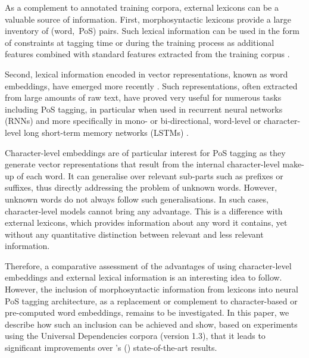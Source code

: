 \documentclass[11pt,a4paper]{article}
\newcommand\hm[1]{\textcolor{blue}{#1}}
\begin{document}
As a complement to  annotated training corpora, external lexicons can be a valuable source of information.
First, morphosyntactic lexicons provide a large inventory of (word,~PoS)
pairs. Such lexical information can be used in the form of constraints at tagging time \cite{kim99,hajic00tagging} or
during the training process as additional features combined with standard features extracted from the training corpus
\cite{chrupala08,goldberg09,denis12}.

Second, lexical information encoded in vector representations, known as word embeddings, have emerged more
recently \cite{bengio03,collobert08,chrupala13,ling15,ballesteros15,muller15}. Such representations, often
extracted from large amounts of raw text, have proved very useful for numerous tasks including PoS tagging, in
particular when used in recurrent neural networks (RNNs) and more specifically in mono- or bi-directional, word-level or
character-level long short-term memory networks (LSTMs) \cite{hochreiter97,ling15,ballesteros15,plank16}.

Character-level embeddings are of particular interest for PoS tagging as they generate vector representations that
result from the internal character-level make-up of each word. It can generalise over relevant sub-parts such as
prefixes or suffixes, thus directly addressing the problem of unknown words. However, unknown words do not always follow
such generalisations. In such cases, character-level models cannot bring any advantage. This is a difference with
external lexicons, which provides information about any word it contains, yet without any quantitative distinction
between relevant and less relevant information.

Therefore, a comparative assessment of the advantages of using character-level embeddings and external lexical
information is an interesting idea to follow. However, the inclusion of morphosyntactic information from lexicons into
neural PoS tagging architecture, as a replacement or complement to character-based or pre-computed word embeddings,
remains to be investigated. In this paper, we describe how such an inclusion can be achieved and show, based on
experiments using the Universal Dependencies corpora (version 1.3), that it leads to significant improvements over
\citeauthor{plank16}'s (\citeyear{plank16}) state-of-the-art results.

\end{document}
